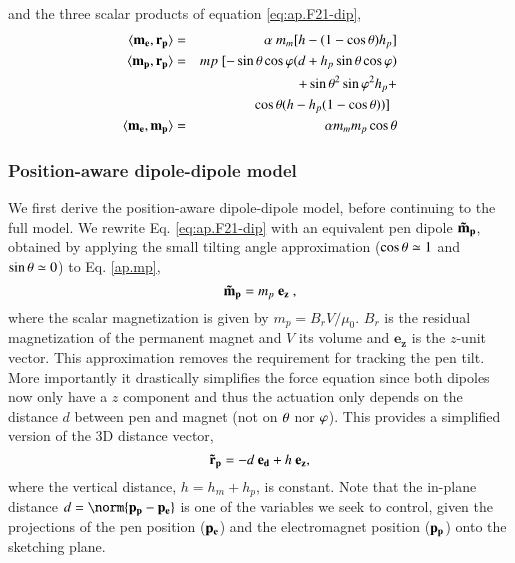     \noindent and the three scalar products of equation \ref{eq:ap.F21-dip},
    \begin{eqnarray}
     \langle\mathbf{m_e},\mathbf{r_{p}}\rangle&=& \alpha \ m_m [h-(1-\cos{\theta})h_p] \label{eq:ap.mm.r.1}\\
     \langle\mathbf{m_p},\mathbf{r_{p}}\rangle&=&mp \ [-\sin{\theta} \cos{\varphi} (d + h_p \sin{\theta} \cos{\varphi}) \nonumber\\
     &&+\sin{\theta}^2 \sin{\varphi}^2 h_p +  \nonumber\\
     &&\cos{\theta} (h - h_p(1-\cos{\theta}))] \ \  \label{eq:ap.mp.r.1} \\
     \langle\mathbf{m_e},\mathbf{m_p}\rangle&=& \alpha m_m m_p \cos{\theta} \label{ap:mm.mp.1}
    \end{eqnarray}

\subsubsection{Position-aware dipole-dipole model}
    \label{sc:ap.position-dipole}
    We first derive the position-aware dipole-dipole model, before continuing to the full  model.
    We rewrite Eq. \ref{eq:ap.F21-dip} with an equivalent pen dipole $\mathbf{\Tilde{m}_{p}}$, obtained by applying the small tilting angle approximation ($\cos{\theta} \simeq 1$ and $\sin{\theta} \simeq 0$) to Eq. \ref{ap.mp}, %
    \begin{equation}
        \mpBoldt = m_p \ \mathbf{e_z} \label{eq:m1t} \ ,
    \end{equation} 
    \noindent where the scalar magnetization is given by $m_p = B_r V/\mu_0$. $B_r$ is the residual magnetization of the permanent magnet and $V$ its volume and  $\mathbf{e_z}$ is the $z$-unit vector. This approximation removes the requirement for tracking the pen tilt. More importantly it drastically simplifies the force equation since both dipoles now only have a $z$ component and thus the actuation only depends on the distance $d$ between pen and magnet (not on $\theta$ nor $\varphi$).
    This provides a simplified version of the 3D distance vector,
    \begin{equation}
        \mathbf{\Tilde{r}_{p}} = - d  \ \mathbf{e_d} + h  \ \mathbf{e_z} , \label{eq:r21b} 
    \end{equation}
    \noindent where the vertical distance, $h = h_m + h_p$, is constant. Note that the in-plane distance $d = \norm{\posp - \posm}$ is one of the variables we seek to control, given the projections of the pen position ($\mathbf{p_e}$) and the electromagnet position ($\mathbf{p_p}$) onto the sketching plane. %
    
